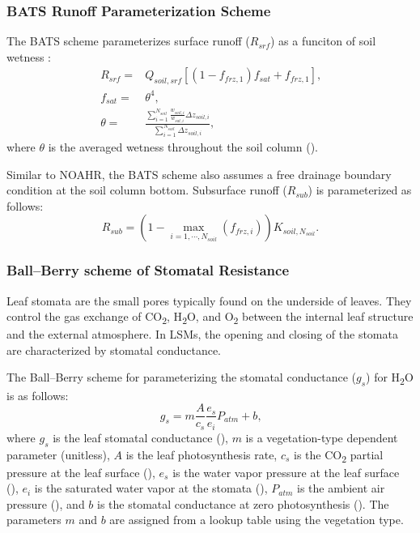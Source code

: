 \documentclass[essd, manuscript]{copernicus}
\let\unit\undefined
\begin{document}
\subsubsection{BATS Runoff Parameterization Scheme}\label{sec:data:noahmp:bats}

The BATS scheme parameterizes surface runoff (\(R_{srf}\)) as a funciton of soil wetness \citep{yang1996GPC}:
\begin{align}
  R_{srf} = & Q_{soil,srf} \left[ (1 - f_{frz,1}) f_{sat} + f_{frz,1} \right]
  \text{,} \\
  f_{sat} = & \theta^4
  \text{,} \\
  \theta =  & \frac{\sum_{i=1}^{N_{soil}}\frac{w_{soil,i}}{w_{sat,i}}\Delta
  z_{soil,i}}
  {\sum_{i=1}^{N_{soil}}\Delta z_{soil,i}}
  \text{,}
\end{align}
where \(\theta\) is the averaged wetness throughout the soil column (\unit{m^3.m^{-3}}).

Similar to NOAHR, the BATS scheme also assumes a free drainage boundary condition at the soil column bottom. Subsurface runoff (\(R_{sub}\)) is parameterized as follows:
\begin{equation}
  R_{sub} = \left(1 - \max_{i=1,\cdots,N_{soil}}(f_{frz,i})\right) K_{soil,N_{soil}}
  \text{.}
\end{equation}

\subsubsection{Ball--Berry scheme of Stomatal Resistance}\label{sec:data:noahmp:ballberry}

Leaf stomata are the small pores typically found on the underside of leaves. They control the gas exchange of CO\textsubscript{2}, H\textsubscript{2}O, and O\textsubscript{2} between the internal leaf structure and the external atmosphere. In LSMs, the opening and closing of the stomata are characterized by stomatal conductance.

The Ball--Berry scheme for parameterizing the stomatal conductance (\(g_{s}\)) for H\textsubscript{2}O is as follows:
\begin{equation}
  g_{s}   = m \frac{A}{c_{s}} \frac{e_{s}}{e_{i}} P_{atm} + b
  \text{,}
\end{equation}
where \(g_{s}\) is the leaf stomatal conductance (\unit{\mu mol.m^{-2}.s^{-1}}), \(m\) is a vegetation-type dependent parameter (unitless), \(A\) is the leaf photosynthesis rate, \(c_{s}\) is the CO\textsubscript{2} partial pressure at the leaf surface (\unit{Pa}), \(e_{s}\) is the water vapor pressure at the leaf surface (\unit{Pa}), \(e_{i}\) is the saturated water vapor at the stomata (\unit{Pa}), \(P_{atm}\) is the ambient air pressure (\unit{Pa}), and \(b\) is the stomatal conductance at zero photosynthesis (\unit{\mu mol.m^{-2}.s^{-1}}). The parameters \(m\) and \(b\) are assigned from a lookup table using the vegetation type.
\end{document}
